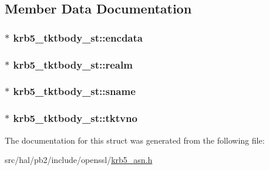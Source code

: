 \subsection{Member Data Documentation}
\subsubsection[{\texorpdfstring{encdata}{encdata}}]{$\ast$ krb5\+\_\+tktbody\+\_\+st\+::encdata}\hypertarget{structkrb5__tktbody__st_af8a772eee7b3423d1d48926ca5dfea20}{}\label{structkrb5__tktbody__st_af8a772eee7b3423d1d48926ca5dfea20}
\subsubsection[{\texorpdfstring{realm}{realm}}]{$\ast$ krb5\+\_\+tktbody\+\_\+st\+::realm}\hypertarget{structkrb5__tktbody__st_afda45dfe18a1811139bec0b5ef92f279}{}\label{structkrb5__tktbody__st_afda45dfe18a1811139bec0b5ef92f279}
\subsubsection[{\texorpdfstring{sname}{sname}}]{$\ast$ krb5\+\_\+tktbody\+\_\+st\+::sname}\hypertarget{structkrb5__tktbody__st_a2348d5ac085e82390778933a463d9333}{}\label{structkrb5__tktbody__st_a2348d5ac085e82390778933a463d9333}
\subsubsection[{\texorpdfstring{tktvno}{tktvno}}]{$\ast$ krb5\+\_\+tktbody\+\_\+st\+::tktvno}\hypertarget{structkrb5__tktbody__st_ab08375dff74a8c2325a6f513a57db966}{}\label{structkrb5__tktbody__st_ab08375dff74a8c2325a6f513a57db966}


The documentation for this struct was generated from the following file\+:\begin{DoxyCompactItemize}
\item 
src/hal/pb2/include/openssl/\hyperlink{krb5__asn_8h}{krb5\+\_\+asn.\+h}\end{DoxyCompactItemize}
